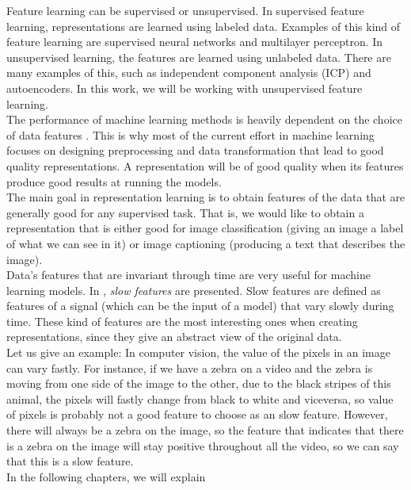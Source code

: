 Feature learning can be supervised or unsupervised. In supervised feature learning, representations are learned using labeled data.
Examples of this kind of feature learning are supervised neural networks and multilayer perceptron. In unsupervised learning, the features are learned using unlabeled data. 
There are many examples of this, such as independent component analysis (ICP) and autoencoders. In this work, we will be working with unsupervised feature learning.\\

The performance of machine learning methods is heavily dependent on the choice of data features \cite{bengio_representation_2014}. This is why most of the current 
effort in machine learning focuses on designing preprocessing and data transformation that lead to good quality representations. A representation will be of good quality when its features
produce good results at running the models.\\

The main goal in representation learning is to obtain features of the data that are generally good for any supervised task. That is, we would like to obtain
a representation that is either good for image classification (giving an image a label of what we can see in it) or image captioning (producing a text that describes the image).\\

Data's features that are invariant through time are very useful for machine learning models. In \cite{wiskott_slow_2002}, \emph{slow features} are presented. Slow features are defined as features of a signal 
(which can be the input of a model) that vary slowly during time. These kind of features are the most interesting ones when creating representations, since they give an abstract view of the original data.\\

Let us give an example: In computer vision, the value of the pixels in an image can vary fastly. For instance, if we have a zebra on a video and the zebra is moving from one side of the image to the other, due 
to the black stripes of this animal, the pixels will fastly change from black to white and viceversa, so value of pixels is probably not a good feature to choose as an slow feature. However, there will always
be a zebra on the image, so the feature that indicates that there is a zebra on the image will stay positive throughout all the video, so we can say that this is a slow feature.\\

In the following chapters, we will explain 


